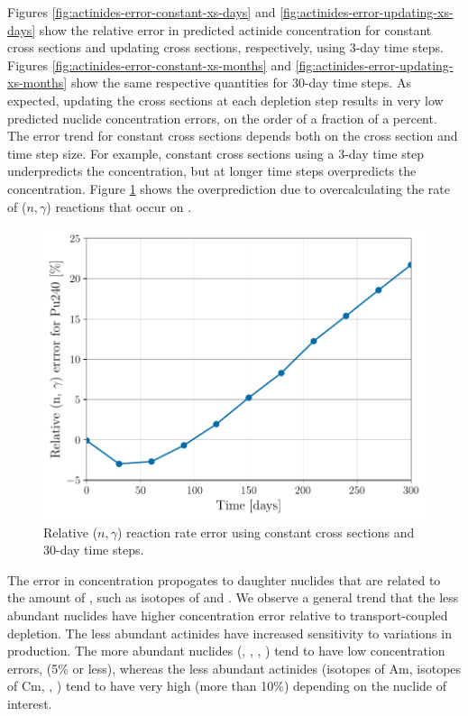     Figures \ref{fig:actinides-error-constant-xs-days} and
    \ref{fig:actinides-error-updating-xs-days} show the relative error in
    predicted actinide concentration for constant cross sections and updating
    cross sections, respectively, using 3-day time steps. Figures
    \ref{fig:actinides-error-constant-xs-months} and
    \ref{fig:actinides-error-updating-xs-months} show the same respective
    quantities for 30-day time steps. As expected, updating the cross sections
    at each depletion step results in very low predicted nuclide concentration
    errors, on the order of a fraction of a percent. The error trend for
    constant cross sections depends both on the cross section and time step
    size. For example, constant cross sections using a 3-day time step
    underpredicts the  concentration, but at longer time steps
    overpredicts the concentration. Figure \ref{fig:pu240-n-gamma-months} shows
    the overprediction due to overcalculating the rate of ($n,\gamma$) reactions
    that occur on . 
    \begin{figure}[htpb]
        \centering
        \includegraphics[width=\linewidth]{figs/pu240-n-gamma-months.pdf}
        \caption{Relative  ($n,\gamma$) reaction rate error using
        constant cross sections and 30-day time steps.}
        \label{fig:pu240-n-gamma-months}
    \end{figure}

    The error in  concentration propogates to daughter nuclides
    that are related to the amount of , such as isotopes of 
    and . We observe a general trend that the less abundant
    nuclides have higher concentration error relative to transport-coupled
    depletion. The less abundant actinides have increased sensitivity to
    variations in production. The more abundant nuclides (,
    , , ) tend to have low concentration
    errors, (5\% or less), whereas the less abundant actinides (isotopes of Am,
    isotopes of Cm, , ) tend to have very high (more
    than 10\%) depending on the nuclide of interest.

